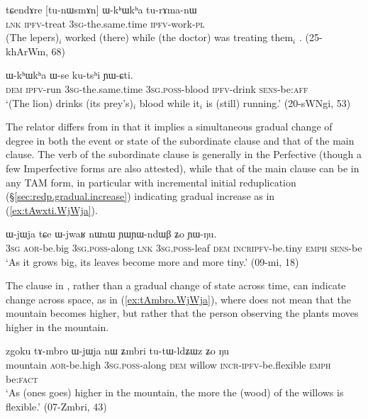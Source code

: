 \begin{exe}
\ex \label{ex:tunWsmAn.WkhWkha}
\gll tɕendɤre [tu-nɯsmɤn] ɯ-kʰɯkʰa tu-rɤma-nɯ  \\
\textsc{lnk} \textsc{ipfv}-treat \textsc{3sg}-the.same.time \textsc{ipfv}-work-\textsc{pl} \\
\glt (The lepers)$_i$ worked (there) while (the doctor) was treating them$_i$ . (25-khArWm, 68)
\end{exe}

\begin{exe}
\ex \label{ex:jurJWG.WkhWkha}
 ɯ-kʰɯkʰa ɯ-se ku-tsʰi ɲɯ-ɕti.  \\
\textsc{dem} \textsc{ipfv}-run \textsc{3sg}-the.same.time \textsc{3sg}.\textsc{poss}-blood \textsc{ipfv}-drink  \textsc{sens}-be:\textsc{aff} \\
\glt `(The lion) drinks (its prey's)$_i$ blood while it$_i$ is (still) running.' (20-sWNgi, 53)
\end{exe}

The relator  differs from  in that it implies a simultaneous gradual change of degree in both the event or state of the subordinate clause and that of the main clause. The verb of the subordinate clause is generally in the Perfective (though a few Imperfective forms are also attested), while that of the main clause can be in any TAM form, in particular with incremental initial reduplication (§\ref{sec:redp.gradual.increase}) indicating gradual increase as in (\ref{ex:tAwxti.WjWja}).

\begin{exe}
\ex \label{ex:tAwxti.WjWja}
 ɯ-jɯja tɕe ɯ-jwaʁ nɯnɯ ɲɯ\redp{}ɲɯ-ndɯβ ʑo ɲɯ-ŋu.  	\\
\textsc{3sg} \textsc{aor}-be.big  \textsc{3sg}.\textsc{poss}-along \textsc{lnk} \textsc{3sg}.\textsc{poss}-leaf \textsc{dem} \textsc{incr\redp{}ipfv}-be.tiny \textsc{emph} \textsc{sens}-be \\
\glt `As it grows big, its leaves become more and more tiny.' (09-mi, 18)
\end{exe}

The clause in , rather than a gradual change of state across time, can indicate change across space, as in (\ref{ex:tAmbro.WjWja}), where  does not mean that the mountain becomes higher, but rather that the person observing the plants moves higher in the mountain.

\begin{exe}
\ex \label{ex:tAmbro.WjWja}
\gll  zgoku tɤ-mbro ɯ-jɯja nɯ ʑmbri tu-tɯ-ldʑɯz ʑo ŋu \\
mountain \textsc{aor}-be.high \textsc{3sg}.\textsc{poss}-along \textsc{dem} willow \textsc{incr}\redp{}-\textsc{ipfv}-be.flexible \textsc{emph} be:\textsc{fact} \\
\glt `As (ones goes) higher in the mountain, the more the (wood) of the willows is flexible.' (07-Zmbri, 43)
\end{exe}

